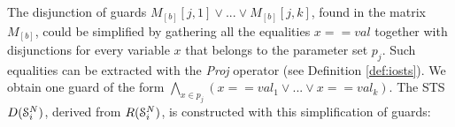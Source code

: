 %
%
%
%
%

The disjunction of guards $M_{[b]}[j,1] \vee ... \vee
M_{[b]}[j,k]$, found in the matrix $M_{[b]}$, could be simplified
by gathering all the equalities $x==val$ together with
disjunctions for every variable $x$ that belongs to the parameter
set $p_j$. Such equalities can be extracted with the
\textit{Proj} operator (see Definition \ref{def:iosts}). We
obtain one guard of the form $\bigwedge_{x \in p_j}(x==val_1 \vee
... \vee x==val_k)$. The STS $D(\EuScript{S}_i^{N})$, derived
from $R(\EuScript{S}_i^{N})$, is constructed with this
simplification of guards:


